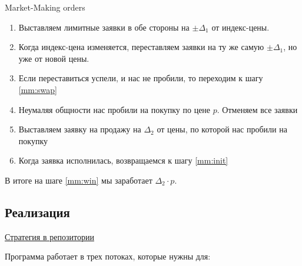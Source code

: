 \begin{algorithm}
Market-Making orders
\begin{enumerate}

    \item \label{mm:init} Выставляем лимитные заявки в обе стороны на $\pm \Delta_1$ от индекс-цены.
    
    \item \label{mm:swap} Когда индекс-цена изменяется, переставляем заявки на ту же самую $\pm \Delta_1$, но уже от новой цены.
    
    \item Если переставиться успели, и нас не пробили, то переходим к шагу \ref{mm:swap}
    
    \item Неумаляя общности нас пробили на покупку по цене $p$. Отменяем все заявки
    
    \item Выставляем заявку на продажу на $\Delta_2$ от цены, по которой нас пробили на покупку
    
    \item \label{mm:win} Когда заявка исполнилась, возвращаемся к шагу \ref{mm:init}
    
\end{enumerate}
\end{algorithm}

В итоге на шаге \ref{mm:win} мы заработает $\Delta_2 \cdot p$.

\subsection{Реализация}
\href{https://github.com/dexety/dex-trading-system/tree/main/research/lp-0003-market-making}{Стратегия в репозитории}

Программа работает в трех потоках, которые нужны для: 

